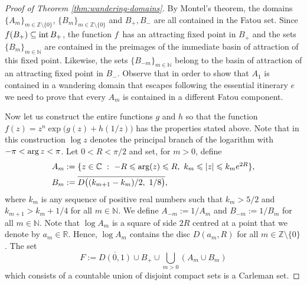 \documentclass[a4paper, 12pt, reqno]{amsart}
\numberwithin{equation}{section}
\theoremstyle{plain}
\theoremstyle{definition}
\theoremstyle{remark}
\newcommand{\C}{{\mathbb{C}}}
\newcommand{\R}{{\mathbb{R}}}
\newcommand{\Z}{{\mathbb{Z}}}
\newcommand{\N}{{\mathbb{N}}}
\begin{document}
\begin{proof}[Proof of Theorem \ref{thm:wandering-domains}]
By Montel's theorem, the domains $\{A_m\}_{m\in \Z\setminus\{0\}}$, $\{B_m\}_{m\in\Z\setminus\{0\}}$ and $B_+,B_-$ are all contained in the Fatou set. Since $f(B_+)\subseteq \textup{int}\,B_+$, the function $f$~has an attracting fixed point in $B_+$ and the sets $\{B_m\}_{m\in\N}$ are contained in the preimages of the immediate basin of attraction of this fixed point. Likewise, the sets $\{B_{-m}\}_{m\in\N}$ belong to the basin of attraction of an attracting fixed point in $B_-$. Observe that in order to show that $A_1$ is contained in a wandering domain that escapes following the essential itinerary $e$ we need to prove that every $A_m$ is contained in a different Fatou component. 

Now let us construct the entire functions $g$ and $h$ so that the function $f(z)=z^n\exp\bigl(g(z)+h(1/z)\bigr)$ has the properties stated above. Note that in this construction $\log z$ denotes the principal branch of the logarithm with \mbox{$-\pi<\textup{arg}\,z<\pi$}. Let $0<R<\pi/2$ and set, for $m>0$, define
$$
\begin{array}{l}
A_m:=\{z\in\C\ :\ -R\leqslant\mbox{arg}(z)\leqslant R,\ k_m\leqslant |z|\leqslant k_m e^{2R}\},\vspace{5pt}\\
B_m:=\overline{D\bigl((k_{m+1}-k_m)/2,\ 1/8\bigr)},
\end{array}
$$
where $k_m$ is any sequence of positive real numbers such that \mbox{$k_m\! >5/2$} and $k_{m+1}>k_m+1/4$ for all $m\in \N$. We define $A_{-m}:=1/A_m$ and $B_{-m}:=1/B_m$ for all $m\in\N$. Note that $\log A_m$ is a square of side $2R$ centred at a point that we denote by $a_m\in \R$. Hence, $\log A_m$ contains the disc $D(a_m,R)$ for all $m\in\Z\setminus\{0\}$. The set 
$$
F:=\overline{D(0,1)}\cup B_+\cup \bigcup_{m>0} (A_m\cup B_m)
$$
which consists of a countable union of disjoint compact sets is a Carleman set.


\end{proof}
\end{document}

